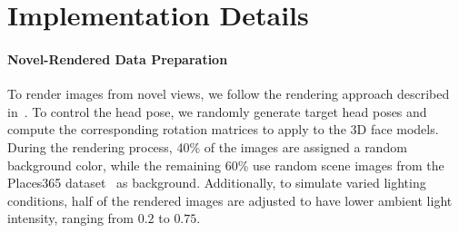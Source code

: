 \begin{table}[t]
\begin{center}
\end{center}
\caption{
    Domain generalization compared with SOTA methods and their re-implementations. 
    The results marked with $^{\dagger}$ are cited from previous studies~\cite{cheng2022puregaze,zhao2024improving}, and the rest of the results are based on our implementation.
}
\label{table:supp_sota}
\end{table}




\section{Implementation Details}

\paragraph{Novel-Rendered Data Preparation}

To render images from novel views, we follow the rendering approach described in~\cite{qin2022learning}.
To control the head pose, we randomly generate target head poses and compute the corresponding rotation matrices to apply to the 3D face models. 
During the rendering process, 40\% of the images are assigned a random background color, while the remaining 60\% use random scene images from the Places365 dataset~\cite{zhou2017places} as background. 
Additionally, to simulate varied lighting conditions, half of the rendered images are adjusted to have lower ambient light intensity, ranging from $0.2$ to $0.75$.

